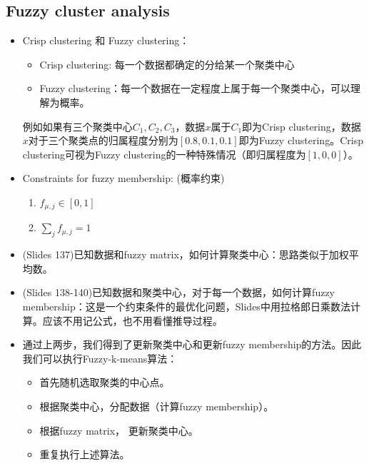 \documentclass[12pt, a4paper, oneside]{ctexart}
\begin{document}
\subsection{Fuzzy cluster analysis}
\begin{itemize}
    \item Crisp clustering 和 Fuzzy clustering：
    \begin{itemize}
        \item Crisp clustering: 每一个数据都确定的分给某一个聚类中心
        \item Fuzzy clustering：每一个数据在一定程度上属于每一个聚类中心，可以理解为概率。
    \end{itemize}
    例如如果有三个聚类中心$C_1,C_2,C_3$，数据$x$属于$C_1$即为Crisp clustering，数据$x$对于三个聚类点的归属程度分别为$[0.8,0.1,0.1]$即为Fuzzy clustering。Crisp clustering可视为Fuzzy clustering的一种特殊情况（即归属程度为$[1,0,0]$）。

    \item Constraints for fuzzy membership: (概率约束)
    \begin{enumerate}
        \item $f_{\mu,j} \in [0,1]$
        \item $\sum_j f_{\mu,j}=1$
    \end{enumerate}

    \item (Slides 137)已知数据和fuzzy matrix，如何计算聚类中心：思路类似于加权平均数。
    \item (Slides 138-140)已知数据和聚类中心，对于每一个数据，如何计算fuzzy membership：这是一个约束条件的最优化问题，Slides中用拉格郎日乘数法计算。应该不用记公式，也不用看懂推导过程。
    \item 通过上两步，我们得到了更新聚类中心和更新fuzzy membership的方法。因此我们可以执行Fuzzy-k-means算法：
    \begin{itemize}
        \item 首先随机选取聚类的中心点。
        \item 根据聚类中心，分配数据（计算fuzzy membership）。
        \item 根据fuzzy matrix， 更新聚类中心。
        \item 重复执行上述算法。
    \end{itemize}
\end{itemize}
\end{document}
